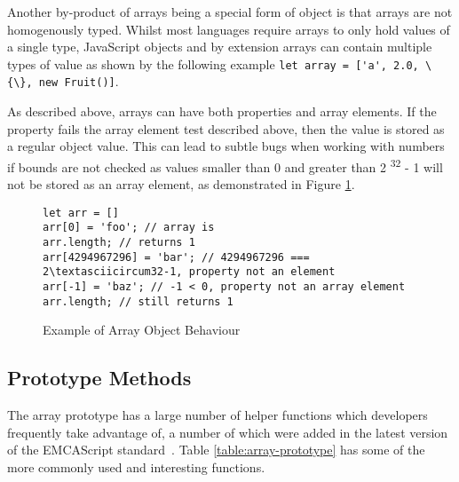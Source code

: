 \documentclass[]{final_report}
\begin{document}
Another by-product of arrays being a special form of object is that arrays are not homogenously typed. Whilst most languages require arrays to only hold values of a single type, JavaScript objects and by extension arrays can contain multiple types of value as shown by the following example \lstinline|let array = ['a', 2.0, \{\}, new Fruit()]|. 

As described above, arrays can have both properties and array elements. If the property fails the array element test described above, then the value is stored as a regular object value. This can lead to subtle bugs when working with numbers if bounds are not checked as values smaller than 0 and greater than 2  \textsuperscript{32} - 1 will not be stored as an array element, as demonstrated in Figure \ref{fig:js-array-max-length}.

\begin{figure}[h]
\begin{verbatim}
let arr = []
arr[0] = 'foo'; // array is 
arr.length; // returns 1
arr[4294967296] = 'bar'; // 4294967296 === 2\textasciicircum32-1, property not an element
arr[-1] = 'baz'; // -1 < 0, property not an array element
arr.length; // still returns 1
\end{verbatim}
\caption{\label{fig:js-array-max-length} Example of Array Object Behaviour }
\end{figure}

\subsection{Prototype Methods}
The array prototype has a large number of helper functions which developers frequently take advantage of, a number of which were added in the latest version of the EMCAScript standard~\cite{EcmaScript}. Table \ref{table:array-prototype} has some of the more commonly used and interesting functions.
\end{document}
